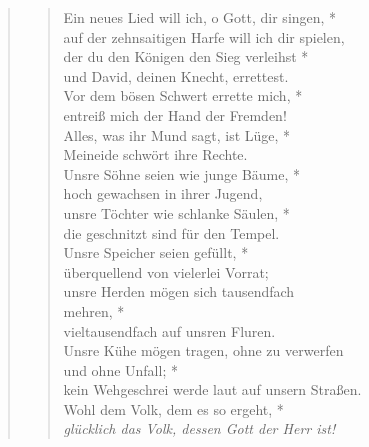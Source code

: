 
\vspace{0.3cm}
\begin{quote}
 


\begin{verse}

 Ein neues Lied will ich, o Gott, dir singen, *\\
auf der zehnsaitigen Harfe will ich dir spielen,\\ \vin 
der du den Königen den Sieg verleihst *\\ \vin 
und David, deinen Knecht, errettest.\\ 
Vor dem bösen Schwert errette mich, *\\
entreiß mich der Hand der Fremden!\\ \vin 
Alles, was ihr Mund sagt, ist Lüge, *\\ \vin  Meineide schwört ihre Rechte.\\
Unsre Söhne seien wie junge Bäume, *\\
hoch gewachsen in ihrer Jugend, \\ \vin 
unsre Töchter wie schlanke Säulen, *\\ \vin  die geschnitzt sind für den Tempel.\\ 
Unsre Speicher seien gefüllt, *\\
überquellend von vielerlei Vorrat; \\ \vin 
unsre Herden mögen sich tausendfach\\ \vin mehren, *\\ \vin  vieltausendfach auf unsren Fluren.\\ 
Unsre Kühe mögen tragen, ohne zu verwerfen\\  und ohne Unfall; *\\
kein Wehgeschrei werde laut auf unsern Straßen.\\ \vin  
Wohl dem Volk, dem es so ergeht, *\\ \vin 
\textit{glücklich das Volk, dessen Gott der Herr ist!} \\
\end{verse}

\end{quote}
\vspace{0.3cm}

\def\greinitialformat#1{{\fontsize{40}{40}\selectfont #1}}
\gresetfirstlineaboveinitial{\small \textcolor{red}{Ps 145a}}{}
\setaboveinitialseparation{0.72mm}

